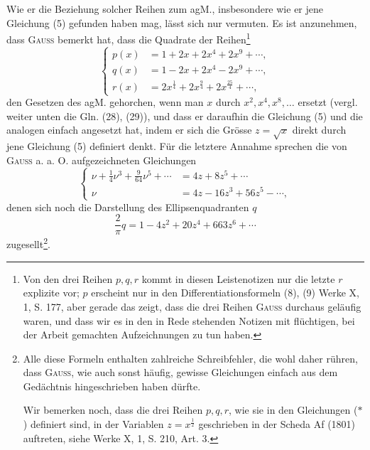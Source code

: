 Wie er die Beziehung solcher Reihen zum agM., insbesondere wie er
jene Gleichung (5) gefunden haben mag, lässt sich nur vermuten. Es ist anzunehmen,
dass \textsc{Gauss} bemerkt hat, dass die Quadrate der Reihen\footnote{Von den drei Reihen \(p,q,r\) kommt in diesen Leistenotizen nur die letzte \(r\) explizite vor; \(p\) erscheint nur in den Differentiationsformeln (8), (9) Werke X, 1, S. 177, aber gerade das zeigt, dass die drei Reihen \textsc{Gauss} durchaus geläufig waren, und dass wir es in den in Rede stehenden Notizen mit flüchtigen, bei der Arbeit gemachten Aufzeichnungen zu tun haben.}
\begin{equation*}
\left\{\begin{aligned}
p(x)&=1+2x+2x^4+2x^9+\cdots,\\
q(x)&=1-2x+2x^4-2x^9+\cdots,\\
r(x)&=2x^{\frac14}+2x^{\frac94}+2x^{\frac{25}4}+\cdots,
\end{aligned}\right.\tag*{(\(\ast\))}
\end{equation*}
\noindent den Gesetzen des agM. gehorchen, wenn man \(x\) durch \(x^2,x^4,x^8,\ldots\) ersetzt
(vergl. weiter unten die Gln. (28), (29)), und dass er daraufhin die Gleichung
(5) und die analogen einfach angesetzt hat, indem er sich die Grösse \(z=\sqrt x\)
direkt durch jene Gleichung (5) definiert denkt. Für die letztere Annahme
sprechen die von \textsc{Gauss} a. a. O. aufgezeichneten Gleichungen
\begin{equation*}
\left\{\begin{aligned}
\nu+\frac14\nu^3+\frac9{64}\nu^5+\cdots&=4z+8z^5+\cdots\\
\nu&=4z-16z^3+56z^5-\cdots,
\end{aligned}\right.\tag*{(6)}
\end{equation*}
\noindent denen sich noch die Darstellung des Ellipsenquadranten \(q\)
\begin{equation*}
\frac2\pi q=1-4z^2+20z^4+663z^6+\cdots\tag*{(7)}
\end{equation*}
\endgroup
\noindent zugesellt\footnote{Alle diese Formeln enthalten zahlreiche Schreibfehler, die wohl daher rühren, dass \textsc{Gauss}, wie auch sonst häufig, gewisse Gleichungen einfach aus dem Gedächtnis hingeschrieben haben dürfte.

Wir bemerken noch, dass die drei Reihen \(p,q,r\), wie sie in den Gleichungen (\(\ast\)) definiert sind, in der Variablen \(z=x^{\frac12}\) geschrieben in der Scheda Af (1801) auftreten, siehe Werke X, 1, S. 210, Art. 3.}.

